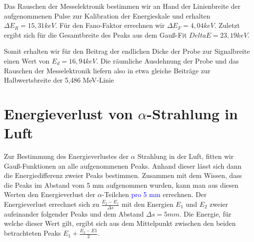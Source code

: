 \documentclass[bigchapter,colorback,accentcolor=tud4b,linedtoc,11pt]{tudreport}
\begin{document}
Das Rauschen der Messelektronik bestimmen wir an Hand der Linienbreite der
aufgenommenen Pulse zur Kalibration der Energieskale und erhalten $\Delta E_R=15,31
keV$. Für den Fano-Faktor errechnen wir $\Delta E_F = 4,04 keV$. Zuletzt ergibt
sich für die Gesamtbreite des Peaks aus dem Gauß-Fit $Delta E = 23,19 keV$.

Somit erhalten wir für den Beitrag der endlichen Dicke der Probe zur
Signalbreite einen Wert von $E_d=16,94 keV$. Die räumliche Ausdehnung der Probe
und das Rauschen der Messelektronik liefern also in etwa gleiche Beiträge zur
Halbwertsbreite der 5,486 MeV-Linie

\section{Energieverlust von $\alpha$-Strahlung in Luft}
Zur Bestimmung des Energieverlustes der $\alpha$ Strahlung in der Luft, fitten
wir Gauß-Funktionen an alle aufgenommenen Peaks. Anhand dieser lässt sich dann
die Energiedifferenz zweier Peaks bestimmen. Zusammen mit dem Wissen, dass die
Peaks im Abstand vom 5 mm aufgenommen wurden, kann man aus diesen Werten den
Energieverlust der $\alpha$-Teilchen \textcolor{blue}{pro 5 mm} errechnen. Der Energieverlust
errechnet sich zu $\frac{E_2-E_1}{\Delta s}$ mit den Energien $E_1$ und $E_2$
zweier aufeinander folgender Peaks und dem Abstand $\Delta s=5mm$. Die Energie,
für welche dieser Wert gilt, ergibt sich aus dem Mittelpunkt zwischen den beiden
betrachteten Peaks $E_1+\frac{E_2-E1}{2}$.
\end{document}

